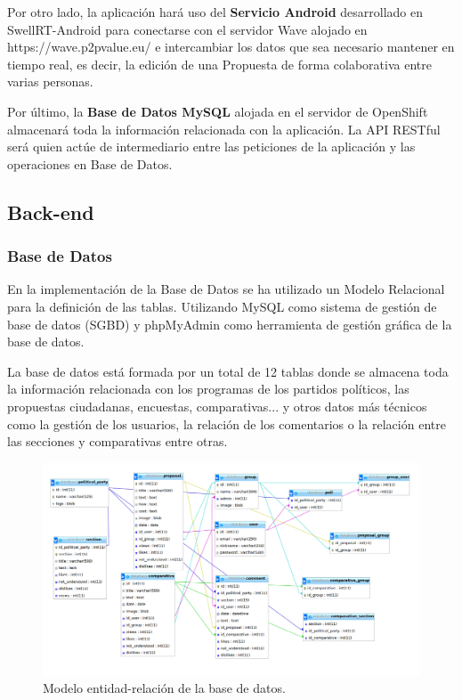Por otro lado, la aplicación hará uso del \textbf{Servicio Android} desarrollado en SwellRT-Android \cite{ref:swellRT_android_github} para conectarse con el servidor Wave alojado en https://wave.p2pvalue.eu/ e intercambiar los datos que sea necesario mantener en tiempo real, es decir, la edición de una Propuesta de forma colaborativa entre varias personas.

Por último, la \textbf{Base de Datos MySQL} alojada en el servidor de OpenShift almacenará toda la información relacionada con la aplicación. La API RESTful será quien actúe de intermediario entre las peticiones de la aplicación y las operaciones en Base de Datos.

\subsection{Back-end}

\subsubsection{Base de Datos}\label{sssec:database}

En la implementación de la Base de Datos se ha utilizado un Modelo Relacional para la definición de las tablas. Utilizando MySQL \cite{ref:MySQL} como sistema de gestión de base de datos (SGBD) y phpMyAdmin \cite{ref:phpMyAdmin} como herramienta de gestión gráfica de la base de datos.

La base de datos está formada por un total de 12 tablas donde se almacena toda la información relacionada con los programas de los partidos políticos, las propuestas ciudadanas, encuestas, comparativas... y otros datos más técnicos como la gestión de los usuarios, la relación de los comentarios o la relación entre las secciones y comparativas entre otras.

\begin{figure}[H]
\centering
\includegraphics[keepaspectratio, scale=0.30]{Media/Captures/database.png}
\caption{Modelo entidad-relación de la base de datos.}
\label{fig:ermodel}
\end{figure}

